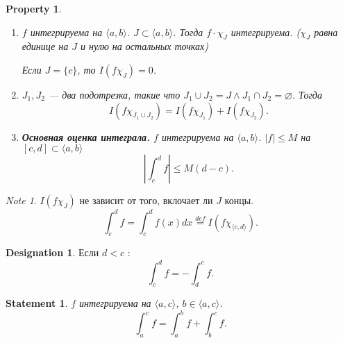 \documentclass[11pt]{book}
\newcommand{\slim}{\sum\limits}
\newcommand{\osc}{{\mathop{\text{\rm osc}}}}
\renewcommand{\le}{\leqslant}
\theoremstyle{definition}
\theoremstyle{plain}
\theoremstyle{plain}
\newtheorem*{st}{Statement}
\newtheorem*{prop}{Property}
\theoremstyle{definition}
\newtheorem*{name}{Designation}
\theoremstyle{remark}
\newtheorem*{note}{Note}
\begin{document}
\begin{prop}
\begin{enumerate}
\begin{proof}
		Получаем \[
		    \begin{array}{c}
			\slim_{J \in  \Sigma} |J| \osc_J f \le  \varepsilon \\
			\slim_{J \in  \Sigma} |J| \osc_J g \le  \varepsilon
		    \end{array}
		.\]
		Тогда $ \forall  J \in  \Sigma: \osc_J (f g) \le  D \cdot \osc_J g + C \cdot \osc_J f$.

		Следовательно, \[
		    \slim_{J \in  \Sigma} |J| \cdot \osc_J fg \le C \cdot \slim_J |J| \cdot \osc_J g + D \cdot \slim_J | J| \cdot \osc_J f \le  (C + D ) \varepsilon
		.\]
	    \end{proof}
	\item
	    $ f$   интегрируема на $ \langle a, b \rangle$. $ J \subset  \langle a, b \rangle$.
	    Тогда $ f \cdot \chi_J $   интегрируема. ($ \chi_J$ равна единице на  $ J$ и нулю на остальных точках)

	    Если $ J = \{c\}$, то $ I(f \chi_J)  = 0$.
	\item $ J_1, J_2$ --- два подотрезка, такие что $ J_1 \cup  J_2 = J \wedge J_1 \cap  J_2 = \varnothing$. Тогда
	    \[
		I(f \chi_{J_1 \cup J_2}) = I(f \chi_{J_1}) + I(f \chi _{J_2})
	    .\]
    \item {\bf Основная оценка интеграла.}
	    $ f$   интегрируема на $ \langle a, b \rangle$.
	    $ |f | \le M$ на $ [c, d] \subset \langle a, b \rangle$
	    \[
		\left| \int_c ^{ d} f \right| \le  M(d-c)
	    .\]
    \end{enumerate}
\end{prop}
\begin{note}
    $ I(f \chi_J)$ не зависит от того, вклочает ли $ J$ концы.
    \[
	\int_c^{d} f  =  \int_c^{d} f(x) dx\stackrel{def} =  I(f \chi _ {\langle c, d \rangle})
    .\]
\end{note}
\begin{name}
    Если $ d < c$ :
    \[
	\int_c^{d} f = - \int_d ^{c} f
    .\]
\end{name}
\begin{st}
    $ f$   интегрируема на $ \langle a, c \rangle$, $ b \in \langle a, c \rangle$.
    \[
	\int_a ^{c} f = \int _a^{ b} f+ \int_b ^{c} f
    .\]
\end{st}
\end{document}
